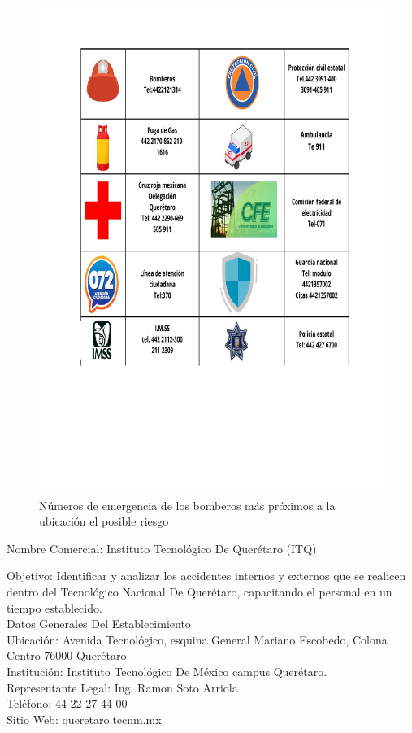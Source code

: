     \begin{figure}[H]
        \centering
        \includegraphics[scale=0.45]{9/Img/numeroEmergencia.pdf}
        \caption{Números de emergencia de los bomberos más próximos a la ubicación el posible riesgo}
    \end{figure}
    
    Nombre Comercial: Instituto Tecnológico De Querétaro (ITQ) 
    
     Objetivo: Identificar y analizar los accidentes internos y externos que se realicen dentro del Tecnológico Nacional De Querétaro, capacitando el personal en un tiempo establecido.\\
    Datos Generales Del Establecimiento\\ 
    Ubicación: Avenida Tecnológico, esquina General Mariano Escobedo, Colona Centro 76000 Querétaro\\
    Institución: Instituto Tecnológico De México campus Querétaro.\\
    Representante Legal: Ing. Ramon Soto Arriola\\  
    Teléfono: 44-22-27-44-00\\ 
    Sitio Web: queretaro.tecnm.mx\\ 
    
